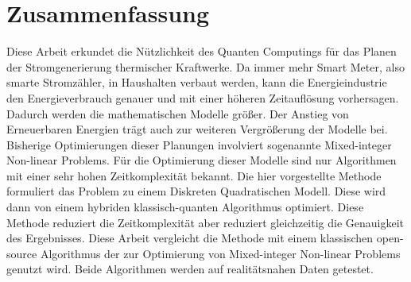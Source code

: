 \chapter{Zusammenfassung}

Diese Arbeit erkundet die Nützlichkeit des Quanten Computings für das Planen der Stromgenerierung thermischer Kraftwerke.
Da immer mehr Smart Meter, also smarte Stromzähler, in Haushalten verbaut werden, kann die Energieindustrie den Energieverbrauch genauer und mit einer höheren Zeitauflösung vorhersagen.
Dadurch werden die mathematischen Modelle größer.
Der Anstieg von Erneuerbaren Energien trägt auch zur weiteren Vergrößerung der Modelle bei.
Bisherige Optimierungen dieser Planungen involviert sogenannte Mixed-integer Non-linear Problems.
Für die Optimierung dieser Modelle sind nur Algorithmen mit einer sehr hohen Zeitkomplexität bekannt.
Die hier vorgestellte Methode formuliert das Problem zu einem Diskreten Quadratischen Modell.
Diese wird dann von einem hybriden klassisch-quanten Algorithmus optimiert.
Diese Methode reduziert die Zeitkomplexität aber reduziert gleichzeitig die Genauigkeit des Ergebnisses.
Diese Arbeit vergleicht die Methode mit einem klassischen open-source Algorithmus der zur Optimierung von Mixed-integer Non-linear Problems genutzt wird.
Beide Algorithmen werden auf realitätsnahen Daten getestet.
